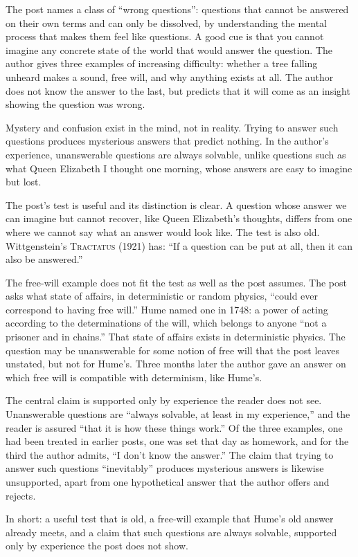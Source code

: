 \begin{afterword}
\summaryhead

The post names a class of ``wrong questions'': questions that cannot be answered on their own terms and can only be dissolved, by understanding the mental process that makes them feel like questions. A good cue is that you cannot imagine any concrete state of the world that would answer the question. The author gives three examples of increasing difficulty: whether a tree falling unheard makes a sound, free will, and why anything exists at all. The author does not know the answer to the last, but predicts that it will come as an insight showing the question was wrong.

Mystery and confusion exist in the mind, not in reality. Trying to answer such questions produces mysterious answers that predict nothing. In the author's experience, unanswerable questions are always solvable, unlike questions such as what Queen Elizabeth I thought one morning, whose answers are easy to imagine but lost.

\responsehead

The post's test is useful and its distinction is clear. A question whose answer we can imagine but cannot recover, like Queen Elizabeth's thoughts, differs from one where we cannot say what an answer would look like. The test is also old. Wittgenstein's \textsc{Tractatus} (1921) has: ``If a question can be put at all, then it can also be answered.''

The free-will example does not fit the test as well as the post assumes. The post asks what state of affairs, in deterministic or random physics, ``could ever correspond to having free will.'' Hume named one in 1748: a power of acting according to the determinations of the will, which belongs to anyone ``not a prisoner and in chains.'' That state of affairs exists in deterministic physics. The question may be unanswerable for some notion of free will that the post leaves unstated, but not for Hume's. Three months later the author gave an answer on which free will is compatible with determinism, like Hume's.

The central claim is supported only by experience the reader does not see. Unanswerable questions are ``always solvable, at least in my experience,'' and the reader is assured ``that it is how these things work.'' Of the three examples, one had been treated in earlier posts, one was set that day as homework, and for the third the author admits, ``I don't know the answer.'' The claim that trying to answer such questions ``inevitably'' produces mysterious answers is likewise unsupported, apart from one hypothetical answer that the author offers and rejects.

In short: a useful test that is old, a free-will example that Hume's old answer already meets, and a claim that such questions are always solvable, supported only by experience the post does not show.
\end{afterword}
